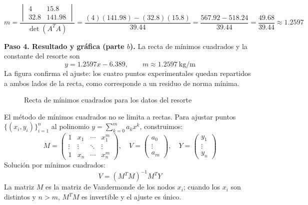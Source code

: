 \begin{example}
\begin{myproof}
\[
m = \frac{
\begin{vmatrix}
4 & 15.8 \\
32.8 & 141.98
\end{vmatrix}
}{\det(A^TA)} = \frac{(4)(141.98) - (32.8)(15.8)}{39.44} = \frac{567.92 - 518.24}{39.44} = \frac{49.68}{39.44} \approx 1.2597
\]

\textbf{Paso 4. Resultado y gráfica (parte $b$).} La recta de mínimos cuadrados y la constante del resorte son
\[
\boxed{y = 1.2597x - 6.389, \qquad m \approx 1.2597\ \text{kg/m}}
\]
La figura confirma el ajuste: los cuatro puntos experimentales quedan repartidos a ambos lados de la recta, como corresponde a un residuo de norma mínima.

\begin{figure}[H]
\centering
{}
\caption{Recta de mínimos cuadrados para los datos del resorte}
\label{fig:recta_minimos_cuadrados}
\end{figure}
\end{myproof}
\end{example}


\begin{rem}\label{rem:regresion_polinomica}
El método de mínimos cuadrados no se limita a rectas. Para ajustar puntos $\{(x_i,y_i)\}_{i=1}^n$ al polinomio $y = \sum_{k=0}^m a_k x^k$, construimos:
\[
M = \begin{pmatrix}
1 & x_1 & \cdots & x_1^m \\
\vdots & \vdots & \ddots & \vdots \\
1 & x_n & \cdots & x_n^m
\end{pmatrix}, \quad
V = \begin{pmatrix} a_0 \\ \vdots \\ a_m \end{pmatrix}, \quad
Y = \begin{pmatrix} y_1 \\ \vdots \\ y_n \end{pmatrix}
\]
Solución por mínimos cuadrados:
\[
V = (M^T M)^{-1} M^T Y
\]
La matriz $M$ es la matriz de Vandermonde de los nodos $x_i$; cuando los $x_i$ son distintos y $n > m$, $M^T M$ es invertible y el ajuste es único.
\end{rem}

